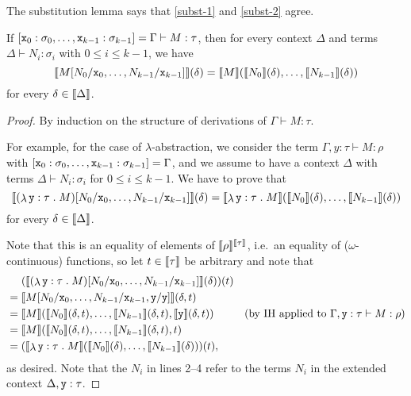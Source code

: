 The substitution lemma says that \eqref{subst-1} and \eqref{subst-2} agree.

\begin{lemma}\label{substitution-lemma}
  If
  \([\mathtt x_0 : \sigma_0,\dots,\mathtt x_{k-1} : \sigma_{k-1}] = \Gamma \vdash M :
  \tau\), then for every context \(\Delta\) and terms
  \(\Delta \vdash N_i : \sigma_i\) with \(0 \leq i \leq k-1\), we have
  \[
    \densem{M[N_0/\var x_0,\dots,N_{k-1}/\var x_{k-1}]}(\delta)
    =
    \densem{M}\pa*{\densem{N_0}(\delta),\dots,\densem{N_{k-1}}(\delta)}
  \]
  for every \(\delta \in \llbracket\Delta\rrbracket\).
\end{lemma}
\begin{proof}
  By induction on the structure of derivations of \(\Gamma \vdash M : \tau\).

  For example, for the case of \(\lambda\)-abstraction, we consider the term
  \(\Gamma,y : \tau \vdash M : \rho\) with
  \([\mathtt x_0 : \sigma_0,\dots,\mathtt x_{k-1} : \sigma_{k-1}] = \Gamma\), and we
  assume to have a context \(\Delta\) with terms
  \(\Delta \vdash N_i : \sigma_i\) for \(0 \leq i \leq k-1\).
  We have to prove that
  \[
    \densem*{\pa*{\lambdadot{\var y : \tau}{M}}[N_0/\var x_0 , \dots ,
      N_{k-1}/\var x_{k-1}]}(\delta) = \densem*{\lambdadot{\var y :
        \tau}{M}}\pa*{\densem{N_0}(\delta),\dots,\densem{N_{k-1}}(\delta)}
  \]
  for every \(\delta \in \llbracket\Delta\rrbracket\).

  Note that this is an equality of elements of
  \(\llbracket\rho\rrbracket^{\llbracket\tau\rrbracket}\), i.e.\ an equality of
  (\(\omega\)-continuous) functions, so let \(t \in \llbracket\tau\rrbracket\) be
  arbitrary and note that
  \begin{align*}
    &\hspace{13.5pt} \pa*{\densem*{\pa*{\lambdadot{\var y : \tau}{M}}[N_0/\var x_0 , \dots ,
    N_{k-1}/\var x_{k-1}]}(\delta)}(t) \\
    &= \densem*{M[N_0/\var x_0,\dots,N_{k-1}/\var x_{k-1},\var y/\var y]}(\delta,t) \\
    &= \densem*{M}\pa*{\densem{N_0}(\delta,t),\dots,\densem{N_{k-1}}(\delta,t),\densem{\var y}(\delta,t)}
    &\text{(by IH applied to \(\Gamma,\var y : \tau \vdash M : \rho\))} \\
    &= \densem*{M}\pa*{\densem{N_0}(\delta,t),\dots,\densem{N_{k-1}}(\delta,t),t} \\
    &= \pa*{\densem*{\lambdadot{\var y :
        \tau}{M}}\pa*{\densem{N_0}(\delta),\dots,\densem{N_{k-1}}(\delta)}}(t),
  \end{align*}
  as desired.
  Note that the \(N_i\) in lines 2--4 refer to the terms \(N_i\) in the extended
  context \(\Delta,\mathtt y : \tau\).
\end{proof}

